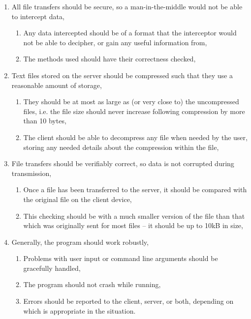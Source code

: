\documentclass[../main.tex]{subfiles}
\begin{document}
\begin{enumerate}
\begin{enumerate}
        \item It should be very unlikely for the server program to use more than 10\% of CPU time for prolonged periods of time while running on such a device; my client's desired server's processor, a 2\textsuperscript{nd} generation Intel i5 processor, can be used as a test case, 
    \end{enumerate}
    \item All file transfers should be secure, so a man-in-the-middle would not be able to intercept data,
    \begin{enumerate}
        \item Any data intercepted should be of a format that the interceptor would not be able to decipher, or gain any useful information from, 
        \item The methods used should have their correctness checked,
    \end{enumerate}
    \item Text files stored on the server should be compressed such that they use a reasonable amount of storage, 
    \begin{enumerate}
        \item They should be at most as large as (or very close to) the uncompressed files, i.e. the file size should never increase following compression by more than 10 bytes,
        \item The client should be able to decompress any file when needed by the user, storing any needed details about the compression within the file, 
    \end{enumerate}
    \item File transfers should be verifiably correct, so data is not corrupted during transmission,
    \begin{enumerate}
        \item Once a file has been transferred to the server, it should be compared with the original file on the client device, 
        \item This checking should be with a much smaller version of the file than that which was originally sent for most files – it should be up to 10kB in size, 
    \end{enumerate}
    \item Generally, the program should work robustly,
        \begin{enumerate}
            \item Problems with user input or command line arguments should be gracefully handled,
            \item The program should not crash while running,
            \item Errors should be reported to the client, server, or both, depending on which is appropriate in the situation.
        \end{enumerate}
\end{enumerate}
\end{document}
